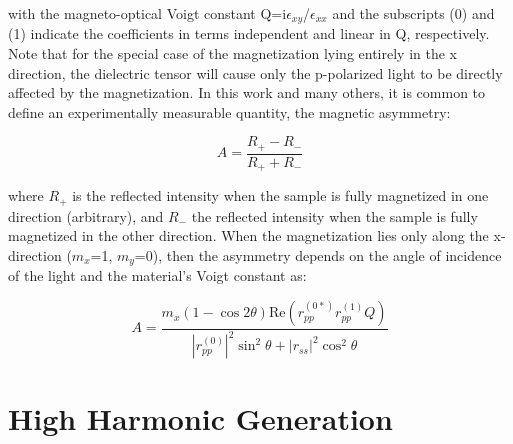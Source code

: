 with the magneto-optical Voigt constant Q=i$\epsilon_{xy}$/$\epsilon_{xx}$ and the subscripts (0) and (1) indicate the coefficients in terms independent and linear in Q, respectively. Note that for the special case of the magnetization lying entirely in the x direction, the dielectric tensor will cause only the p-polarized light to be directly affected by the magnetization. In this work and many others, it is common to define an experimentally measurable quantity, the magnetic asymmetry:

\begin{equation}
A=\frac{R_+ - R_-}{R_+ + R_-}
\end{equation}

where $R_+$ is the reflected intensity when the sample is fully magnetized in one direction (arbitrary), and $R_-$ the reflected intensity when the sample is fully magnetized in the other direction. When the magnetization lies only along the x-direction ($m_x$=1, $m_y$=0), then the asymmetry depends on the angle of incidence of the light and the material's Voigt constant as:

\begin{equation}
A = \frac{m_x(1-\cos{2\theta})\text{Re}(r_{pp}^{(0*)}r_{pp}^{(1)}Q)}{|r_{pp}^{(0)}|^2\sin^2{\theta}+|r_{ss}|^2\cos^2{\theta}}
\end{equation}


\section{High Harmonic Generation}

